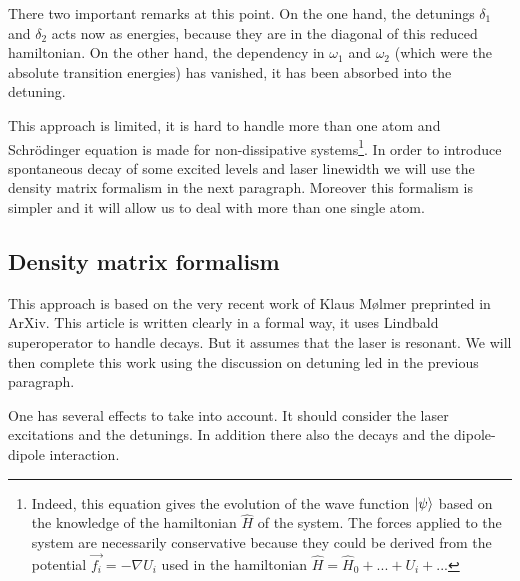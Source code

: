 \documentclass[%
]{scrreprt}
\newcommand{\om}{\omega}
\begin{document}
\par There two important remarks at this point. On the one hand, the detunings $\delta_1$ and $\delta_2$ acts now as energies, because they are in the diagonal of this reduced hamiltonian. On the other hand, the dependency in $\om_1$ and $\om_2$ (which were the absolute transition energies) has vanished, it has been absorbed into the detuning.

\par This approach is limited, it is hard to handle more than one atom and Schrödinger equation is made for non-dissipative systems\footnote{Indeed, this equation gives the evolution of the wave function $\ket{\psi}$ based on the knowledge of the hamiltonian $\hat{H}$ of the system. The forces applied to the system are necessarily conservative because they could be derived from the potential $\vec{f_i} = - \nabla U_i$ used in the hamiltonian $\hat{H} = \hat{H}_0 + ... + U_i + ...$}. In order to introduce spontaneous decay of some excited levels and laser linewidth we will use the density matrix formalism in the next paragraph. Moreover this formalism is simpler and it will allow us to deal with more than one single atom.

\subsection{Density matrix formalism}

\par This approach is based on the very recent work of Klaus Mølmer preprinted in ArXiv. This article is written clearly in a formal way, it uses Lindbald superoperator to handle decays. But it assumes that the laser is resonant. We will then complete this work using the discussion on detuning led in the previous paragraph.

\par One has several effects to take into account. It should consider the laser excitations and the detunings. In addition there also the decays and the dipole-dipole interaction. 
\end{document}
